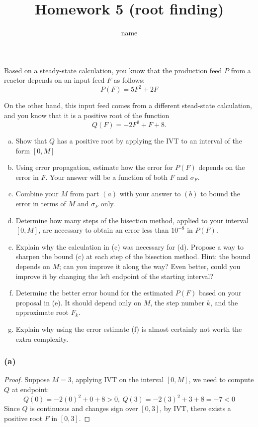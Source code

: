 \documentclass{article}
\title{\vspace{-5em}Homework 5 (root finding)}
\author{name}
\begin{document}
\maketitle


\begin{problem}
    Based on a steady-state calculation, you know that the production feed \(P\) from a reactor depends on an input feed \(F\) as follows:
    \[P(F) = 5F^2 + 2F\]

    On the other hand, this input feed comes from a different stead-state calculation, and you know that it is a positive root of the function
    \[Q(F) = -2F^2 + F + 8.\]

    \begin{enumerate}[a)]
        \item Show that \(Q\) has a positive root by applying the IVT to an interval of the form \([0,M]\)
        \item Using error propagation, estimate how the error for \(P(F)\) depends on the error in \(F\). Your answer will be a function of both \(F\) and \(\sigma_F\).
        \item Combine your \(M\) from part \((a)\) with your answer to \((b)\) to bound the error in terms of \(M\) and \(\sigma_F\) only. 
        \item Determine how many steps of the bisection method, applied to your interval \([0,M]\), are necessary to obtain an error less than \(10^{-8}\) in \(P(F)\).
        \item Explain why the calculation in (c) was necessary for (d). Propose a way to sharpen the bound (c) at each step of the bisection method. Hint: the bound depends on \(M\); can you improve it along the way? Even better, could you improve it by changing the left endpoint of the starting interval?
        \item Determine the better error bound for the estimated \(P(F)\) based on your proposal in (e). It should depend only on \(M\), the step number \(k\), and the approximate root \(F_k\).
        \item Explain why using the error estimate (f) is almost certainly not worth the extra complexity.
    \end{enumerate}
\end{problem}

\subsubsection*{(a)}
\begin{proof}
    Suppose $M = 3$, applying IVT on the interval $[0, M]$, we need to compute $Q$ at endpoint:
    \[ Q(0) = -2(0)^2 + 0 + 8 > 0, \ Q(3) = -2(3)^2 + 3 + 8 = -7 < 0 \]
    Since $Q$ is continuous and changes sign over $[0,3]$, by IVT, there exists a positive root $F$ in $[0, 3]$.
\end{proof}
\end{document}

